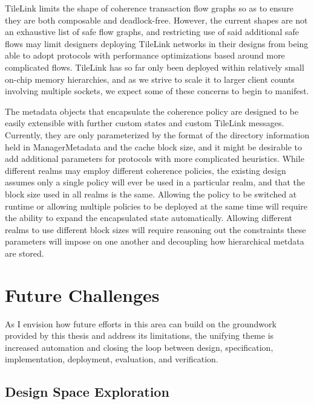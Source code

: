 TileLink limits the shape of coherence transaction flow graphs so as to ensure they are both composable and deadlock-free.
However, the current shapes are not an exhaustive list of safe flow graphs,
and restricting use of said additional safe flows may limit designers deploying TileLink networks in their designs
from being able to adopt protocols with performance optimizations based around more complicated flows.
TileLink has so far only been deployed within relatively small on-chip memory hierarchies,
and as we strive to scale it to larger client counts involving multiple sockets,
 we expect some of these concerns to begin to manifest. 

The metadata objects that encapsulate the coherence policy are designed to be easily extensible with
further custom states and custom TileLink messages.
Currently, they are only parameterized by the format of the directory information held in ManagerMetadata
and the cache block size,
and it might be desirable to add additional parameters for protocols with more complicated heuristics.
While different realms may employ different coherence policies,
the existing design assumes only a single policy will ever be used in a particular realm,
and that the block size used in all realms is the same.
Allowing the policy to be switched at runtime or allowing multiple policies to be deployed at the same time will require the ability to expand the encapsulated state automatically.
Allowing different realms to use different block sizes will require reasoning out the constraints these parameters will impose on one another and decoupling how hierarchical metdata are stored.

\section{Future Challenges}

As I envision how future efforts in this area can build on the groundwork provided by this thesis and address its limitations,
the unifying theme is increased automation and closing the loop between
design, specification, implementation, deployment, evaluation, and verification.

\subsection{Design Space Exploration}


